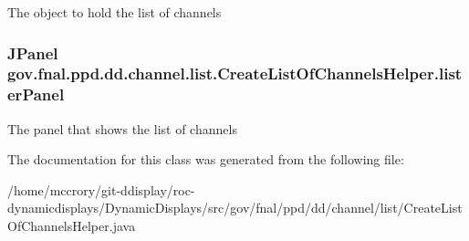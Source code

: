 The object to hold the list of channels \hypertarget{classgov_1_1fnal_1_1ppd_1_1dd_1_1channel_1_1list_1_1CreateListOfChannelsHelper_af7f5d450eff8fc117d70ddd5e0621308}{
\subsubsection[{lister\-Panel}]{\setlength{\rightskip}{0pt plus 5cm}J\-Panel gov.\-fnal.\-ppd.\-dd.\-channel.\-list.\-Create\-List\-Of\-Channels\-Helper.\-lister\-Panel}}\label{classgov_1_1fnal_1_1ppd_1_1dd_1_1channel_1_1list_1_1CreateListOfChannelsHelper_af7f5d450eff8fc117d70ddd5e0621308}
The panel that shows the list of channels 

The documentation for this class was generated from the following file\-:\begin{DoxyCompactItemize}
\item 
/home/mccrory/git-\/ddisplay/roc-\/dynamicdisplays/\-Dynamic\-Displays/src/gov/fnal/ppd/dd/channel/list/Create\-List\-Of\-Channels\-Helper.\-java\end{DoxyCompactItemize}
